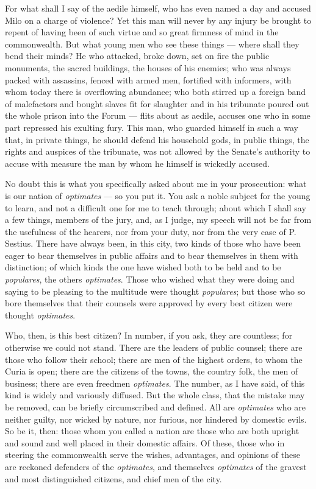  For what shall I say of the aedile himself, who has even named a day and accused Milo on a charge of violence? Yet this man will never by any injury be brought to repent of having been of such virtue and so great firmness of mind in the commonwealth. But what young men who see these things --- where shall they bend their minds? He who attacked, broke down, set on fire the public monuments, the sacred buildings, the houses of his enemies; who was always packed with assassins, fenced with armed men, fortified with informers, with whom today there is overflowing abundance; who both stirred up a foreign band of malefactors and bought slaves fit for slaughter and in his tribunate poured out the whole prison into the Forum --- flits about as aedile, accuses one who in some part repressed his exulting fury. This man, who guarded himself in such a way that, in private things, he should defend his household gods, in public things, the rights and auspices of the tribunate, was not allowed by the Senate's authority to accuse with measure the man by whom he himself is wickedly accused.

 No doubt this is what you specifically asked about me in your prosecution: what is our nation of \textit{optimates} --- so you put it. You ask a noble subject for the young to learn, and not a difficult one for me to teach through; about which I shall say a few things, members of the jury, and, as I judge, my speech will not be far from the usefulness of the hearers, nor from your duty, nor from the very case of P. Sestius. There have always been, in this city, two kinds of those who have been eager to bear themselves in public affairs and to bear themselves in them with distinction; of which kinds the one have wished both to be held and to be \textit{populares}, the others \textit{optimates}. Those who wished what they were doing and saying to be pleasing to the multitude were thought \textit{populares}; but those who so bore themselves that their counsels were approved by every best citizen were thought \textit{optimates}.

 Who, then, is this best citizen? In number, if you ask, they are countless; for otherwise we could not stand. There are the leaders of public counsel; there are those who follow their school; there are men of the highest orders, to whom the Curia is open; there are the citizens of the towns, the country folk, the men of business; there are even freedmen \textit{optimates}. The number, as I have said, of this kind is widely and variously diffused. But the whole class, that the mistake may be removed, can be briefly circumscribed and defined. All are \textit{optimates} who are neither guilty, nor wicked by nature, nor furious, nor hindered by domestic evils. So be it, then: those whom you called a nation are those who are both upright and sound and well placed in their domestic affairs. Of these, those who in steering the commonwealth serve the wishes, advantages, and opinions of these are reckoned defenders of the \textit{optimates}, and themselves \textit{optimates} of the gravest and most distinguished citizens, and chief men of the city.

